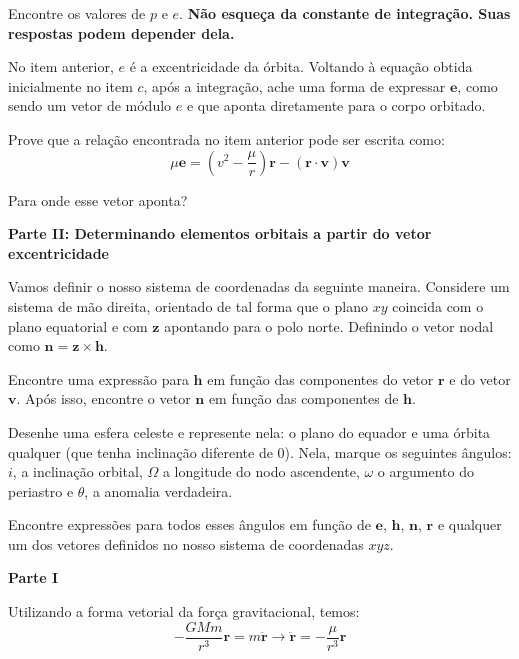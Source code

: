 \documentclass[11pt]{article}
\begin{document}
\begin{pproblem}
\begin{alternativas}
        Encontre os valores de \(p\) e \(e\). \textbf{Não esqueça da constante de integração. Suas respostas podem depender dela.}

        \item No item anterior, \(e\) é a excentricidade da órbita. Voltando à equação obtida inicialmente no item \(c\), após a integração, ache uma forma de expressar \(\mathbf{e}\), como sendo um vetor de módulo \(e\) e que aponta diretamente para o corpo orbitado.
        
        \item Prove que a relação encontrada no item anterior pode ser escrita como:
        \[\mu \mathbf{e} = (v^2-\frac{\mu}{r})\mathbf{r} - (\mathbf{r}\cdot\mathbf{v})\mathbf{v}\]

        Para onde esse vetor aponta?
    \end{alternativas}
    \begin{center}
        \textbf{Parte II: Determinando elementos orbitais a partir do vetor excentricidade}     
    \end{center}
    Vamos definir o nosso sistema de coordenadas da seguinte maneira. Considere um sistema de mão direita, orientado de tal forma que o plano \(xy\) coincida com o plano equatorial e com \(\mathbf{z}\) apontando para o polo norte. Definindo o vetor nodal como \(\mathbf{n} = \mathbf{z} \times \mathbf{h}\).
    \begin{alternativas}
        \item Encontre uma expressão para \(\mathbf{h}\) em função das componentes do vetor \(\mathbf{r}\) e do vetor \(\mathbf{v}\). Após isso, encontre o vetor \(\mathbf{n}\) em função das componentes de \(\mathbf{h}\).

        \item Desenhe uma esfera celeste e represente nela: o plano do equador e uma órbita qualquer (que tenha inclinação diferente de 0). Nela, marque os seguintes ângulos: \(i\), a inclinação orbital, \(\Omega\) a longitude do nodo ascendente, \(\omega\) o argumento do periastro e \(\theta\), a anomalia verdadeira. 

        \item Encontre expressões para todos esses ângulos em função de \(\mathbf{e}\), \(\mathbf{h}\), \(\mathbf{n}\), \(\mathbf{r}\) e qualquer um dos vetores definidos no nosso sistema de coordenadas \(xyz\).
    \end{alternativas}

    \begin{pssolution*}{}{}
        \begin{center}
            \textbf{Parte I}
        \end{center}
        \begin{alternativas}
            \item Utilizando a forma vetorial da força gravitacional, temos:
            \[-\frac{GMm}{r^3}\mathbf{r} = m\ddot{\mathbf{r}} \rightarrow \boxed{\ddot{\mathbf{r}}= -\frac{\mu}{r^3}\mathbf{r}}\]


\end{alternativas}
\end{pssolution*}
\end{pproblem}
\end{document}
